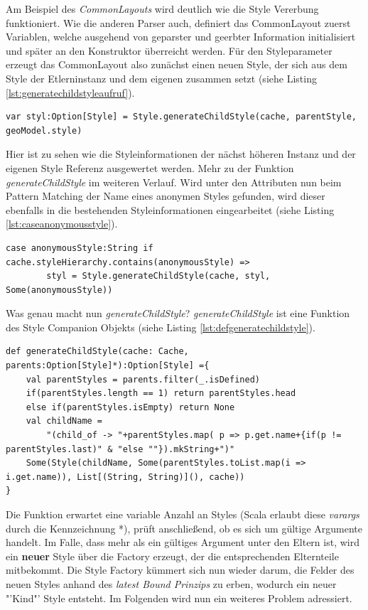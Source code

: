 Am Beispiel des \textit{CommonLayouts} wird deutlich wie die Style Vererbung funktioniert.
Wie die anderen Parser auch, definiert das CommonLayout zuerst Variablen, welche ausgehend von geparster und geerbter Information initialisiert und später an den Konstruktor überreicht werden. Für den Styleparameter erzeugt das CommonLayout also zunächst einen neuen Style, der sich aus dem Style der Etlerninstanz und dem eigenen zusammen setzt (siehe Listing \ref{lst:generatechildstyleaufruf}).
\begin{lstlisting}[style=scala, caption = {Erzeugen eines neuen Styles über andere Styleinstanzen}, label = {lst:generatechildstyleaufruf}]
var styl:Option[Style] = Style.generateChildStyle(cache, parentStyle, geoModel.style)
\end{lstlisting}
Hier ist zu sehen wie die Styleinformationen der nächst höheren Instanz und der eigenen Style Referenz ausgewertet werden. Mehr zu der Funktion \textit{generateChildStyle} im weiteren Verlauf. Wird unter den Attributen nun beim Pattern Matching der Name eines anonymen Styles gefunden, wird dieser ebenfalls in die bestehenden Styleinformationen eingearbeitet (siehe Listing \ref{lst:caseanonymousstyle}).
\begin{lstlisting}[style=scala, caption = {Auszug aus Code Erzeugen von Kindstyles}, label = {lst:caseanonymousstyle}]
case anonymousStyle:String if cache.styleHierarchy.contains(anonymousStyle) =>
        styl = Style.generateChildStyle(cache, styl, Some(anonymousStyle))
\end{lstlisting}Was genau macht nun \textit{generateChildStyle}?
\textit{generateChildStyle} ist eine Funktion des Style Companion Objekts (siehe Listing \ref{lst:defgeneratechildstyle}).
\begin{lstlisting}[style=scala, caption = {Auszug aus Code Funktion generateChildStyle}, label = {lst:defgeneratechildstyle}]
def generateChildStyle(cache: Cache, parents:Option[Style]*):Option[Style] ={
    val parentStyles = parents.filter(_.isDefined)
    if(parentStyles.length == 1) return parentStyles.head
    else if(parentStyles.isEmpty) return None
    val childName =
        "(child_of -> "+parentStyles.map( p => p.get.name+{if(p != parentStyles.last)" & "else ""}).mkString+")"
    Some(Style(childName, Some(parentStyles.toList.map(i => i.get.name)), List[(String, String)](), cache))
}
\end{lstlisting}Die Funktion erwartet eine variable Anzahl an Styles (Scala erlaubt diese \textit{varargs} durch die Kennzeichnung *), prüft anschließend, ob es sich um gültige Argumente handelt. Im Falle, dass mehr als ein gültiges Argument unter den Eltern ist, wird ein \textbf{neuer} Style über die Factory erzeugt, der die entsprechenden Elternteile mitbekommt. Die Style Factory kümmert sich nun wieder darum, die Felder des neuen Styles anhand des \textit{latest Bound Prinzips} zu erben, wodurch ein neuer "'Kind"' Style entsteht.
Im Folgenden wird nun ein weiteres Problem adressiert.
